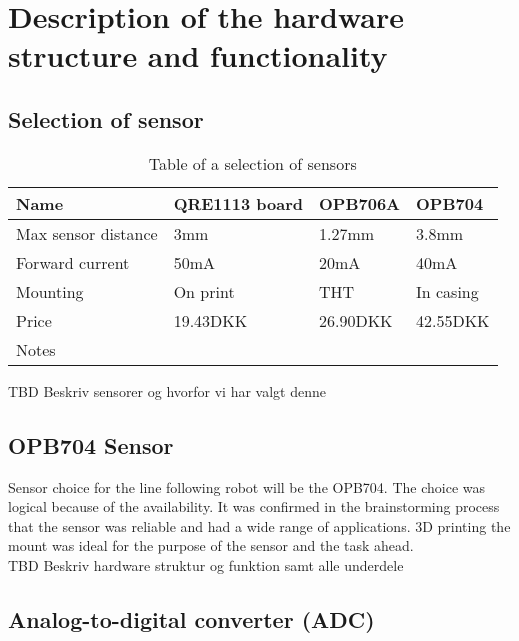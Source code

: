 \section{Description of the hardware structure and functionality}
\subsection{Selection of sensor}
\begin{table}[htbp]
    \begin{tabular}{|l|l|l|l|}
        \hline
        Name                & QRE1113 board & OPB706A  & OPB704    \\ \hline
        Max sensor distance & 3mm                            & 1.27mm   & 3.8mm     \\ \hline
        Forward current     & 50mA                           & 20mA     & 40mA      \\ \hline
        Mounting            & On print                       & THT      & In casing \\ \hline
        Price               & 19.43DKK                       & 26.90DKK & 42.55DKK  \\ \hline
        Notes               & ~                              & ~        & ~         \\
        \hline
    \end{tabular}
    \caption{Table of a selection of sensors}
\label{sensor_tabel}
\end{table}
TBD Beskriv sensorer og hvorfor vi har valgt denne
\newline
\subsection{OPB704 Sensor}
Sensor choice for the line following robot will be the OPB704. The choice was logical because of the availability. It was confirmed in the brainstorming process that the sensor was reliable and had a wide range of applications. 3D printing the mount was ideal for the purpose of the sensor and the task ahead.
\newline 
\\
TBD Beskriv hardware 
struktur og funktion samt alle underdele


\subsection{Analog-to-digital converter (ADC)}

